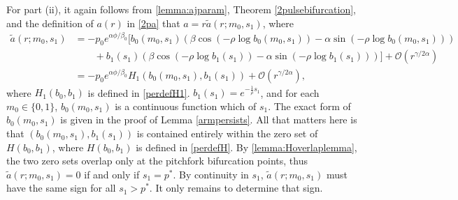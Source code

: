 \documentclass[thesis.tex]{subfiles}
\begin{document}
For part (ii), it again follows from \cref{lemma:ajparam}, Theorem \cref{2pulsebifurcation}, and the definition of $a(r)$ in \cref{2pa} that $a = r \tilde{a}(r; m_0, s_1)$, where
\begin{align*}
\tilde{a}(r; m_0, s_1) &= -p_0 e^{\alpha \phi/\beta_0} \Big[ b_0(m_0, s_1) \left( \beta \cos\left(-\rho \log b_0(m_0, s_1) \right) - \alpha \sin \left(-\rho \log b_0(m_0, s_1) \right) \right) \\
&\qquad+ b_1(s_1) \left( \beta \cos\left(-\rho \log b_1(s_1) \right) - \alpha \sin \left(-\rho \log b_1(s_1) \right) \right) \Big]  + \mathcal{O}(r^{\gamma/2\alpha}) \\
&= -p_0 e^{\alpha \phi/\beta_0} H_1( b_0(m_0, s_1), b_1(s_1) ) + \mathcal{O}(r^{\gamma/2\alpha}),
\end{align*}
where $H_1(b_0, b_1)$ is defined in \cref{perdefH1}.
$b_1(s_1) = e^{-\frac{1}{\rho}s_1}$, and for each $m_0 \in \{ 0, 1 \}$, $b_0(m_0, s_1)$ is a continuous function which of $s_1$. The exact form of $b_0(m_0, s_1)$ is given in the proof of Lemma \ref{armpersists}. All that matters here is that $(b_0(m_0, s_1), b_1(s_1))$ is contained entirely within the zero set of $H(b_0, b_1)$, where $H(b_0, b_1)$ is defined in \cref{perdefH}. By \cref{lemma:Hoverlaplemma}, the two zero sets overlap only at the pitchfork bifurcation points, thus $\tilde{a}(r; m_0, s_1) = 0$ if and only if $s_1 = p^*$. By continuity in $s_1$, $\tilde{a}(r; m_0, s_1)$ must have the same sign for all $s_1 > p^*$. It only remains to determine that sign.
\end{document}
